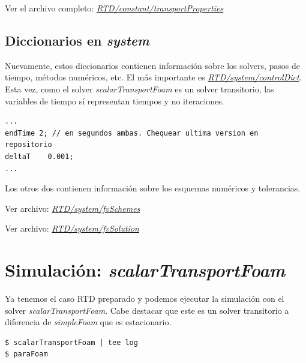 \documentclass{article}
\begin{document}
Ver el archivo completo: \textit{\href{https://github.com/guillerolle/casos_cfd/blob/master/01/RTD/constant/transportProperties}{RTD/constant/transportProperties}}

%


\subsection{Diccionarios en \textit{system}}
Nuevamente, estos diccionarios contienen información sobre los solvers, pasos de tiempo, métodos numéricos, etc.
El más importante es \textit{\href{https://github.com/guillerolle/casos_cfd/blob/master/01/RTD/system/controlDict}{RTD/system/controlDict}}.  Esta vez, como el solver \textit{scalarTransportFoam} es un solver transitorio, las variables de tiempo sí representan tiempos y no iteraciones.

\begin{lstlisting}
...
endTime 2; // en segundos ambas. Chequear ultima version en repositorio
deltaT 	  0.001;  
...
\end{lstlisting}

Los otros dos contienen información sobre los esquemas numéricos y tolerancias.\par
Ver archivo: \textit{\href{https://github.com/guillerolle/casos_cfd/blob/master/01/RTD/system/fvSchemes}{RTD/system/fvSchemes}}\par
Ver archivo:
\textit{\href{https://github.com/guillerolle/casos_cfd/blob/master/01/RTD/system/fvSolution}{RTD/system/fvSolution}}


%
%
%

\section{Simulación: \textit{scalarTransportFoam}}
Ya tenemos el caso RTD preparado y podemos ejecutar la simulación con el solver \textit{scalarTransportFoam}. Cabe destacar que este es un solver transitorio a diferencia de \textit{simpleFoam} que es estacionario.

\begin{lstlisting}
$ scalarTransportFoam | tee log
$ paraFoam
\end{lstlisting}
\end{document}
